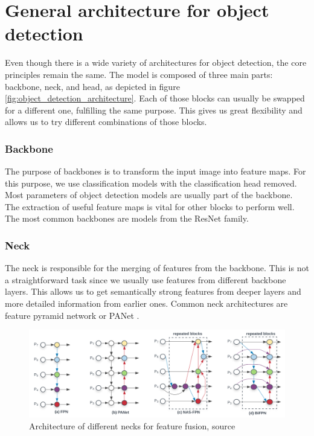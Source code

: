 \section{General architecture for object detection}
Even though there is a wide variety of architectures for object detection, the core principles remain the same. The model is composed of three main parts: backbone, neck, and head, as depicted in figure \ref{fig:object_detection_architecture}. Each of those blocks can usually be swapped for a different one, fulfilling the same purpose. This gives us great flexibility and allows us to try different combinations of those blocks.



\subsubsection{Backbone}
The purpose of backbones is to transform the input image into feature maps. For this purpose, we use classification models with the classification head removed. Most parameters of object detection models are usually part of the backbone. The extraction of useful feature maps is vital for other blocks to perform well. The most common backbones are models from the ResNet family.

\subsubsection{Neck}
The neck is responsible for the merging of features from the backbone. This is not a straightforward task since we usually use features from different backbone layers. This allows us to get semantically strong features from deeper layers and more detailed information from earlier ones. Common neck architectures are feature pyramid network or PANet \cite{Lin_2017_CVPR}.
\begin{figure}
    \centering
    \includegraphics[width=\linewidth]{images/necks_architecture.png}
    \caption{Architecture of different necks for feature fusion, source \cite{Tan2019}}
    \label{fig:necks}
\end{figure}

